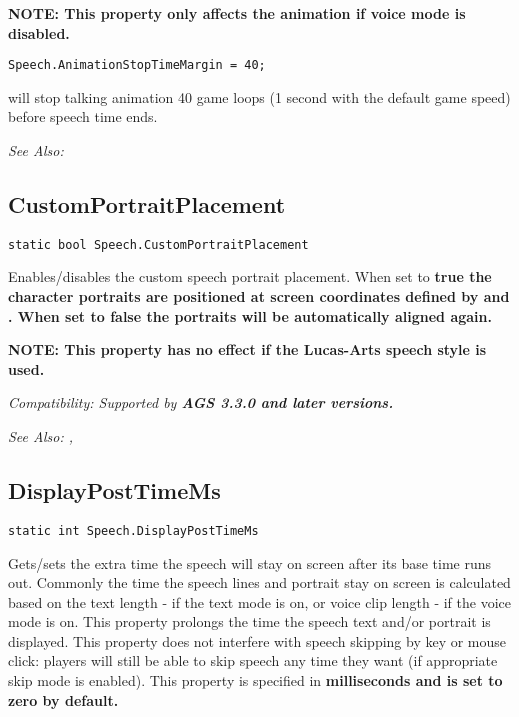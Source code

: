 \bf{NOTE:} This property only affects the animation if voice mode is disabled.

\begin{verbatim}
Speech.AnimationStopTimeMargin = 40;
\end{verbatim}
will stop talking animation 40 game loops (1 second with the default game speed) before speech time ends.

\it{See Also:} 


\subsection{CustomPortraitPlacement}\label{Speech.CustomPortraitPlacement}%

\begin{verbatim}
static bool Speech.CustomPortraitPlacement
\end{verbatim}

Enables/disables the custom speech portrait placement. When set to \bf{true} the character portraits are positioned at screen coordinates defined by  and . When set to \bf{false} the portraits will be automatically aligned again.

\bf{NOTE:} This property has no effect if the Lucas-Arts speech style is used.

\it{Compatibility:} Supported by \bf{AGS 3.3.0} and later versions.

\it{See Also:} ,


\subsection{DisplayPostTimeMs}\label{Speech.DisplayPostTimeMs}%

\begin{verbatim}
static int Speech.DisplayPostTimeMs
\end{verbatim}

Gets/sets the extra time the speech will stay on screen after its base time runs out.
Commonly the time the speech lines and portrait stay on screen is calculated based on the text length - if the text mode is on, or voice clip length - if the voice mode is on. This property prolongs the time the speech text and/or portrait is displayed.
This property does not interfere with speech skipping by key or mouse click: players will still be able to skip speech any time they want (if appropriate skip mode is enabled).
This property is specified in \bf{milliseconds} and is set to zero by default.

